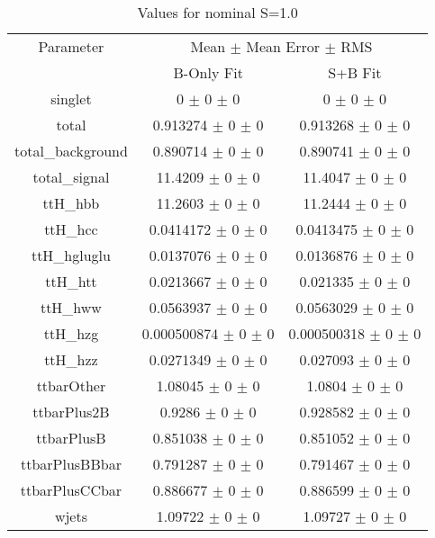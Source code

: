 \begin{table}
\centering
\caption{Values for nominal S=1.0}
\begin{tabular}{ccc}
\toprule
Parameter 	& \multicolumn{2}{c}{Mean $\pm$ Mean Error $\pm$ RMS}\\
 	& B-Only Fit & S+B Fit\\
\midrule
singlet 	& \num{0} $\pm$ \num{0} $\pm$ \num{0} 	& \num{0} $\pm$ \num{0} $\pm$ \num{0}\\
total 	& \num{0.913274} $\pm$ \num{0} $\pm$ \num{0} 	& \num{0.913268} $\pm$ \num{0} $\pm$ \num{0}\\
total\_background 	& \num{0.890714} $\pm$ \num{0} $\pm$ \num{0} 	& \num{0.890741} $\pm$ \num{0} $\pm$ \num{0}\\
total\_signal 	& \num{11.4209} $\pm$ \num{0} $\pm$ \num{0} 	& \num{11.4047} $\pm$ \num{0} $\pm$ \num{0}\\
ttH\_hbb 	& \num{11.2603} $\pm$ \num{0} $\pm$ \num{0} 	& \num{11.2444} $\pm$ \num{0} $\pm$ \num{0}\\
ttH\_hcc 	& \num{0.0414172} $\pm$ \num{0} $\pm$ \num{0} 	& \num{0.0413475} $\pm$ \num{0} $\pm$ \num{0}\\
ttH\_hgluglu 	& \num{0.0137076} $\pm$ \num{0} $\pm$ \num{0} 	& \num{0.0136876} $\pm$ \num{0} $\pm$ \num{0}\\
ttH\_htt 	& \num{0.0213667} $\pm$ \num{0} $\pm$ \num{0} 	& \num{0.021335} $\pm$ \num{0} $\pm$ \num{0}\\
ttH\_hww 	& \num{0.0563937} $\pm$ \num{0} $\pm$ \num{0} 	& \num{0.0563029} $\pm$ \num{0} $\pm$ \num{0}\\
ttH\_hzg 	& \num{0.000500874} $\pm$ \num{0} $\pm$ \num{0} 	& \num{0.000500318} $\pm$ \num{0} $\pm$ \num{0}\\
ttH\_hzz 	& \num{0.0271349} $\pm$ \num{0} $\pm$ \num{0} 	& \num{0.027093} $\pm$ \num{0} $\pm$ \num{0}\\
ttbarOther 	& \num{1.08045} $\pm$ \num{0} $\pm$ \num{0} 	& \num{1.0804} $\pm$ \num{0} $\pm$ \num{0}\\
ttbarPlus2B 	& \num{0.9286} $\pm$ \num{0} $\pm$ \num{0} 	& \num{0.928582} $\pm$ \num{0} $\pm$ \num{0}\\
ttbarPlusB 	& \num{0.851038} $\pm$ \num{0} $\pm$ \num{0} 	& \num{0.851052} $\pm$ \num{0} $\pm$ \num{0}\\
ttbarPlusBBbar 	& \num{0.791287} $\pm$ \num{0} $\pm$ \num{0} 	& \num{0.791467} $\pm$ \num{0} $\pm$ \num{0}\\
ttbarPlusCCbar 	& \num{0.886677} $\pm$ \num{0} $\pm$ \num{0} 	& \num{0.886599} $\pm$ \num{0} $\pm$ \num{0}\\
wjets 	& \num{1.09722} $\pm$ \num{0} $\pm$ \num{0} 	& \num{1.09727} $\pm$ \num{0} $\pm$ \num{0}\\
\bottomrule
\end{tabular}
\end{table}